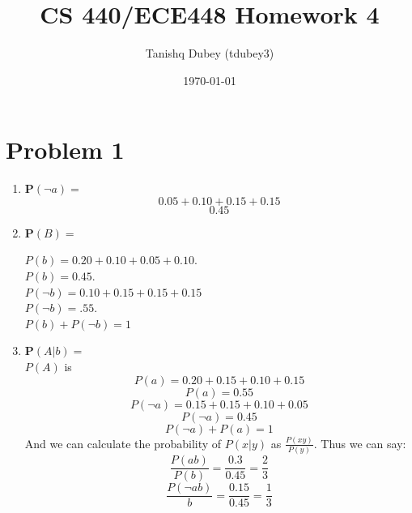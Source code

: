 \documentclass[12pt]{article}%
\begin{document}
\title{CS 440/ECE448 Homework 4}
\author{Tanishq Dubey (tdubey3)}
\date{\today}
\maketitle
\section*{Problem 1}
    \begin{enumerate}[1.]
            \item
                $\textbf{P}(\neg a) = $
                \[0.05 + 0.10 + 0.15 + 0.15\]
                \[0.45\]
            \item
                $\textbf{P}(B) = $
                \begin{center}
                    $P(b) = 0.20 + 0.10 + 0.05 + 0.10$. \\
                    $P(b) = 0.45$. \\
                    $P(\neg b) = 0.10 + 0.15 + 0.15 + 0.15$ \\
                    $P(\neg b) = .55$.\\
                    $P(b) + P(\neg b) = 1$
                \end{center}
            \item
                $\textbf{P}(A|b) = $ \\
                $P(A)$ is 
                \[P(a) = 0.20 + 0.15 + 0.10 + 0.15\]
                \[P(a) = 0.55\]
                \[P(\neg a) = 0.15 + 0.15 + 0.10 + 0.05\]
                \[P(\neg a) = 0.45\]
                \[P(\neg a) + P(a) = 1\]
                And we can calculate the probability of $P(x|y)$ as $\frac{P(xy)}{P(y)}$. Thus we can say:\\
                \[ \frac{P(ab)}{P(b)} = \frac{0.3}{0.45} = \frac{2}{3}\]
                \[ \frac{P(\neg a b)}{b} = \frac{0.15}{0.45} = \frac{1}{3}\]
    \end{enumerate}
\newpage
\end{document}
